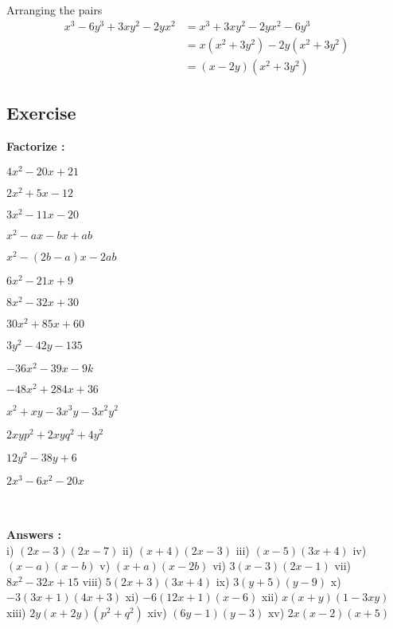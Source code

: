 \documentclass{article}
\begin{document}
\begin{enumerate}
\begin{paracol}{2}
		Arranging the pairs
		$$
		\begin{aligned}
			x^{3} -6 y^{3} +3 x y^{2}-2 y x^{2} &= x^{3} +3 x y^{2}-2 y x^{2}-6 y^{3} \\
			&= x\left(x^{2}+3 y^{2}\right)-2 y\left(x^{2}+3 y^{2}\right) \\
			&= (x-2 y)\left(x^{2}+3 y^{2}\right)
		\end{aligned}
		$$
	\end{paracol}
\end{enumerate}
\subsection{Exercise}
\textbf{Factorize :}
\begin{enumerate*}[label=(\roman*)]
	\item $4x^2 - 20x + 21$ \item $2x^2 + 5x - 12$ \item $3x^2 - 11x - 20$ \item $x^2 - ax - bx + ab$ \item $x^2 - (2b - a)x - 2ab$ \item $6x^2 - 21x + 9$ \item $8x^2 - 32x + 30$ \item $30x^2 + 85x + 60$ \item $3y^2 - 42y - 135$ \item $-36x^2 - 39x - 9k$ \item $-48x^2 + 284x + 36$ \item $x^2 + xy - 3x^3y - 3x^2y^2$ \item $2xy p^2 + 2xy q^2 + 4y^2$ \item $12y^2 - 38y + 6$ \item $2x^3 - 6x^2 - 20x$
\end{enumerate*}\\\\
{\small \textbf{Answers :}}\\
{\footnotesize i) $(2x-3)(2x-7)$} {\footnotesize ii) $(x+4)(2x-3)$} {\footnotesize iii) $(x-5)(3x+4)$} {\footnotesize iv) $(x-a)(x-b)$} {\footnotesize v) $(x+a)(x-2b)$} {\footnotesize vi) $3(x-3)(2x-1)$} {\footnotesize vii) $8x^2-32x+15$} {\footnotesize viii) $5(2x+3)(3x+4)$} {\footnotesize ix) $3(y+5)(y-9)$} {\footnotesize x) $-3(3x+1)(4x+3)$} {\footnotesize xi) $-6(12x+1)(x-6)$} {\footnotesize xii) $x(x+y)(1-3xy)$} {\footnotesize xiii) $2y(x+2y)(p^2+q^2)$} {\footnotesize xiv) $(6y-1)(y-3)$} {\footnotesize xv) $2x(x-2)(x+5)$}
\end{document}
